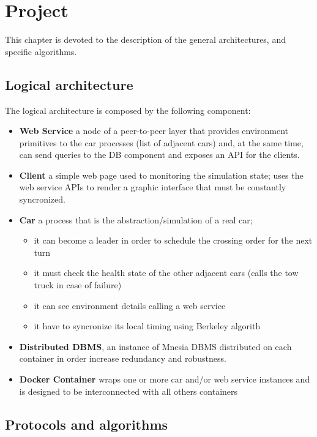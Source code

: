 \chapter{Project}\label{ch:project}

This chapter is devoted to the description of the general architectures, 
and specific algorithms.


\section{Logical architecture}

The logical architecture is composed by the following component:
\begin{itemize}
    \item \textbf{Web Service} a node of a peer-to-peer layer that 
        provides environment primitives to the car processes (list of adjacent cars) and, 
        at the same time, can send queries to the DB component and exposes an API for the 
        clients.
    \item \textbf{Client} a simple web page used to monitoring the simulation state; 
        uses the web service APIs to render a graphic interface that must 
        be constantly syncronized.
    \item \textbf{Car} a process that is the abstraction/simulation of a real car; 
        \begin{itemize}
            \item it can become a leader in order to schedule the crossing order for the next turn
            \item it must check the health state of the other adjacent cars 
                (calls the tow truck in case of failure)
            \item it can see environment details calling a web service 
            \item it have to syncronize its local timing using Berkeley algorith
        \end{itemize}
    \item \textbf{Distributed DBMS}, an instance of Mnesia DBMS distributed 
        on each container in order increase redundancy and robustness. 
    \item \textbf{Docker Container} wraps one or more car and/or web service instances 
        and is designed to be interconnected with all others containers 
    \end{itemize}


\section{Protocols and algorithms}


